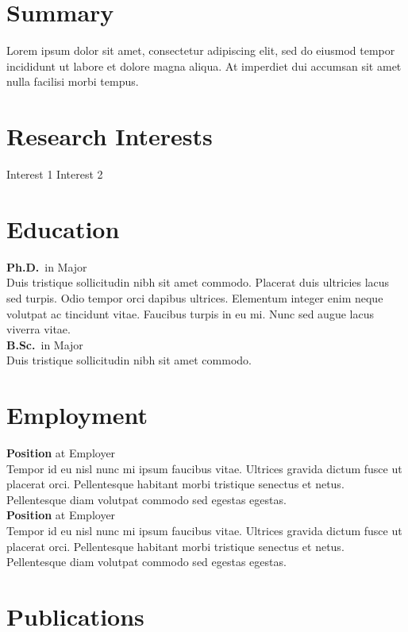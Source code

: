 \documentclass{curriculumvitae}[letter,twoside]
\author{John Doe}
\begin{document}
	
	\maketitle
	
	\section*{Summary}
	
	Lorem ipsum dolor sit amet, consectetur adipiscing elit, sed do eiusmod tempor incididunt ut labore et dolore magna aliqua. At imperdiet dui accumsan sit amet nulla facilisi morbi tempus.
	
	\section*{Research Interests}
	Interest 1 \textbullet{} Interest 2
	
	\section*{Education}
	
	\textbf{Ph.D.}\ in Major\\[.2cm]
	Duis tristique sollicitudin nibh sit amet commodo. Placerat duis ultricies lacus sed turpis. Odio tempor orci dapibus ultrices. Elementum integer enim neque volutpat ac tincidunt vitae. Faucibus turpis in eu mi. Nunc sed augue lacus viverra vitae.\\[.2cm]
	\textbf{B.Sc.}\ in Major\\[.2cm]
	Duis tristique sollicitudin nibh sit amet commodo.
	
	\section*{Employment}
	
	\textbf{Position} at Employer\\[.2cm] 
	Tempor id eu nisl nunc mi ipsum faucibus vitae. Ultrices gravida dictum fusce ut placerat orci. Pellentesque habitant morbi tristique senectus et netus. Pellentesque diam volutpat commodo sed egestas egestas. \\[.2cm]
	\textbf{Position} at Employer\\[.2cm] 
	Tempor id eu nisl nunc mi ipsum faucibus vitae. Ultrices gravida dictum fusce ut placerat orci. Pellentesque habitant morbi tristique senectus et netus. Pellentesque diam volutpat commodo sed egestas egestas.
	
	\section*{Publications}
	
\end{document}
